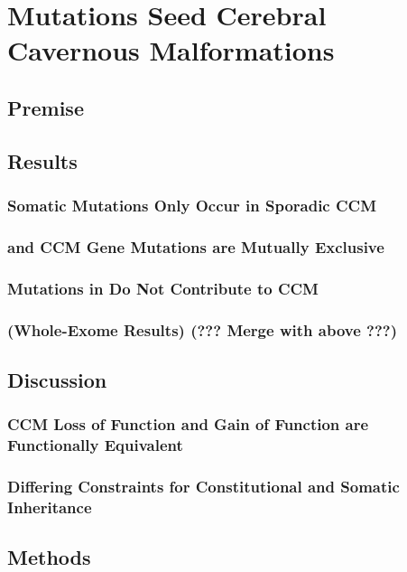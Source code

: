\chapter{ Mutations Seed Cerebral Cavernous Malformations}
\label{chap:map3k3}

\section{Premise}

\section{Results}
\subsection{ Somatic Mutations Only Occur in Sporadic CCM}
\subsection{ and CCM Gene Mutations are Mutually Exclusive}
\subsection{Mutations in  Do Not Contribute to CCM}
\subsection{(Whole-Exome Results) (??? Merge with above ???)} 

\section{Discussion}
\subsection{CCM Loss of Function and  Gain of Function are Functionally Equivalent}
\subsection{Differing Constraints for Constitutional and Somatic Inheritance}

\section{Methods}